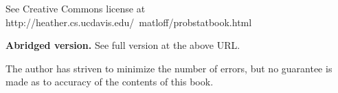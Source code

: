 {\LARGE See Creative Commons license at \\ 
\vspace{0.1in}
{http://heather.cs.ucdavis.edu/~matloff/probstatbook.html}
}

{\bf Abridged version.} See full version at the above URL.

The author has striven to minimize the number of errors, but no
guarantee is made as to accuracy of the contents of this book.

